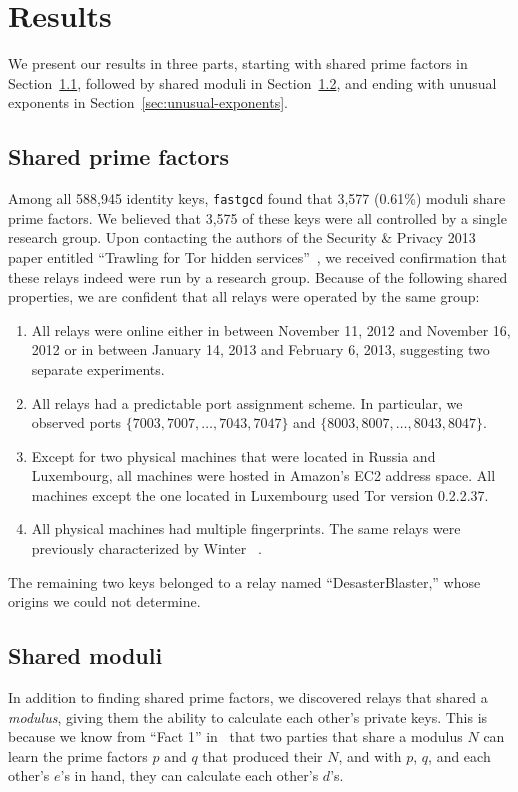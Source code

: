 \section{Results}
\label{sec:results}
We present our results in three parts, starting with shared prime factors in
Section~\ref{sec:shared-primes}, followed by shared moduli in
Section~\ref{sec:shared-moduli}, and ending with unusual exponents 
in Section~\ref{sec:unusual-exponents}.

\subsection{Shared prime factors}
\label{sec:shared-primes}
Among all 588,945 identity keys, \texttt{fastgcd} found that 3,577 (0.61\%) 
moduli share prime factors.  We believed that 3,575 of these keys 
were all controlled by a single research group.  
Upon contacting the authors of the Security \& Privacy
2013 paper entitled ``Trawling for Tor hidden services''~\cite{Biryukov2013a}, 
we received confirmation that these relays indeed were run by a research group.
Because of the following shared properties, we are confident that all relays
were operated by the same group:

\begin{enumerate}
	\item All relays were online either in between November 11, 2012 and
		November 16, 2012 or in between January 14, 2013 and February 6, 2013,
		suggesting two separate experiments.

	\item All relays had a predictable port assignment scheme.  In particular,
		we observed ports $\{7003, 7007, \dots, 7043, 7047\}$ and $\{8003, 8007,
		\dots, 8043, 8047\}$.

	\item Except for two physical machines that were located in Russia and
		Luxembourg, all machines were hosted in Amazon's EC2 address space.  All
		machines except the one located in Luxembourg used Tor version
		0.2.2.37.

	\item All physical machines had multiple fingerprints.  The same relays were
		previously characterized by Winter \ea~\cite[\S~5.1]{Winter2016a}.
\end{enumerate}

The remaining two keys belonged to a relay named ``DesasterBlaster,'' whose
origins we could not determine.

\subsection{Shared moduli}
\label{sec:shared-moduli}
In addition to finding shared prime factors, we discovered relays that shared a
\emph{modulus}, giving them the ability to calculate each other's private keys.
This is because we know from ``Fact 1'' in~\cite[\S~1.1]{Boneh1999a} that two parties 
that share a modulus $N$ can learn the prime factors $p$ and $q$ that produced their $N$, 
and with $p$, $q$, and each other's $e$'s in hand, they can calculate each other's
$d$'s.

